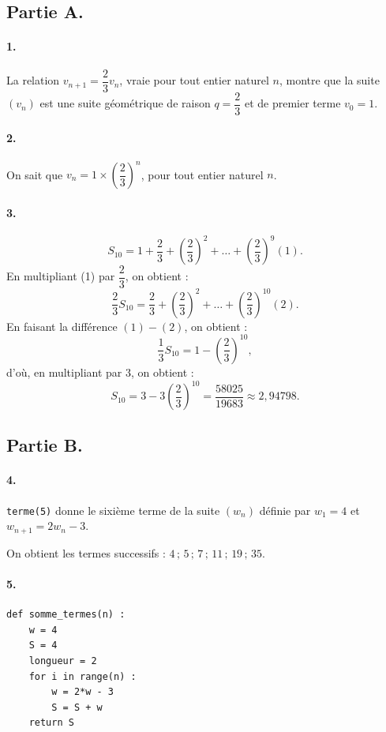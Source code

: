\subsection*{Partie A.}

\paragraph{1.} La relation \(v_{n+1} = \dfrac{2}{3} v_n\), vraie pour tout entier naturel \(n\), montre que la suite \((v_n)\) est une suite géométrique de raison \(q = \dfrac{2}{3}\) et de premier terme \(v_0 = 1\).

\paragraph{2.} On sait que \(v_n = 1 \times \left(\dfrac{2}{3}\right)^n\), pour tout entier naturel \(n\).

\paragraph{3.}
\[
S_{10} = 1 + \dfrac{2}{3} + \left(\dfrac{2}{3}\right)^2 + \dots + \left(\dfrac{2}{3}\right)^9 (1).
\]
En multipliant (1) par \(\dfrac{2}{3}\), on obtient :
\[
\dfrac{2}{3} S_{10} = \dfrac{2}{3} + \left(\dfrac{2}{3}\right)^2 + \dots + \left(\dfrac{2}{3}\right)^{10} (2).
\]
En faisant la différence \((1) - (2)\), on obtient :
\[
\dfrac{1}{3} S_{10} = 1 - \left(\dfrac{2}{3}\right)^{10},
\]
d'où, en multipliant par \(3\), on obtient :
\[
S_{10} = 3 - 3\left(\dfrac{2}{3}\right)^{10} = \dfrac{58025}{19683} \approx 2{,}94798.
\]

\subsection*{Partie B.}

\paragraph{4.} \texttt{terme(5)} donne le sixième terme de la suite \((w_n)\) définie par \(w_1 = 4\) et \(w_{n+1} = 2w_n - 3\).

On obtient les termes successifs : \(4\,;\,5\,;\,7\,;\,11\,;\,19\,;\,35\).

\paragraph{5.}

\begin{center}
\begin{lstlisting}[style=python]
def somme_termes(n) :	
	w = 4
	S = 4
	longueur = 2
	for i in range(n) :
		w = 2*w - 3
		S = S + w
	return S
\end{lstlisting}
\end{center}

